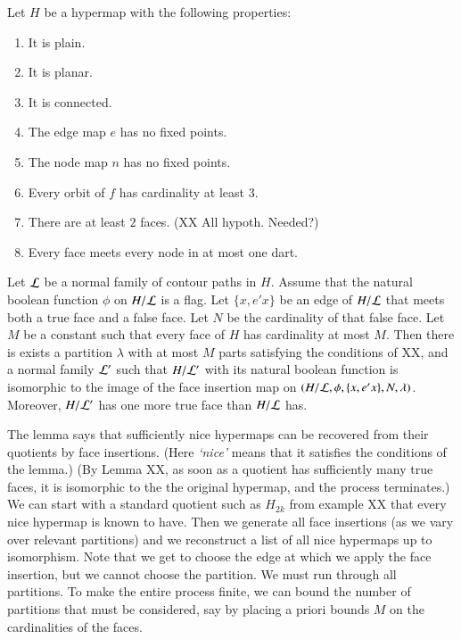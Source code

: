 \begin{lemma}  Let $H$ be a hypermap with the following properties:
    \begin{enumerate}
        \item It is plain.
        \item It is planar.
        \item It is connected.
        \item The edge map $e$ has no fixed points.
        \item The node map $n$ has no fixed points.
        \item Every orbit of $f$ has cardinality at least $3$.
        \item There are at least $2$ faces.  (XX All hypoth. Needed?)
        \item Every face meets every node in at most one
        dart.
    \end{enumerate}
Let $\cal L$ be a normal family of contour paths in $H$. Assume that
the natural boolean function $\phi$ on $H/{\cal L}$ is a flag. Let
$\{x,e' x\}$ be an edge of $H/{\cal L}$ that meets both a true face
and a false face. Let $N$ be the cardinality of that false face. Let
$M$ be a constant such that every face of $H$ has cardinality at
most $M$. Then there is exists a partition $\lambda$ with at most
$M$ parts satisfying the conditions of XX, and a normal family
${\cal L}'$ such that $H/{\cal L}'$ with its natural boolean
function is isomorphic to the image of the face insertion map on
$(H/{\cal L},\phi,\{x,e' x\},N,\lambda)$. Moreover, $H/{\cal L}'$
has one more true face than $H/{\cal L}$ has.
\end{lemma}

\begin{remark} The lemma says that sufficiently nice hypermaps can be recovered
from their quotients by face insertions.  (Here {\it `nice'} means
that it satisfies the conditions of the lemma.)   (By Lemma XX, as
soon as a quotient has sufficiently many true faces, it is
isomorphic to the the original hypermap, and the process
terminates.) We can start with a standard quotient such as $H_{2k}$
from example XX that every nice hypermap is known to have. Then we
generate all face insertions (as we vary over relevant partitions)
and we reconstruct a list of all nice hypermaps up to isomorphism.
Note that we get to choose the edge at which we apply the face
insertion, but we cannot choose the partition.  We must run through
all partitions.  To make the entire process finite, we can bound the
number of partitions that must be considered, say by placing a
priori bounds $M$ on the cardinalities of the faces.
\end{remark}

